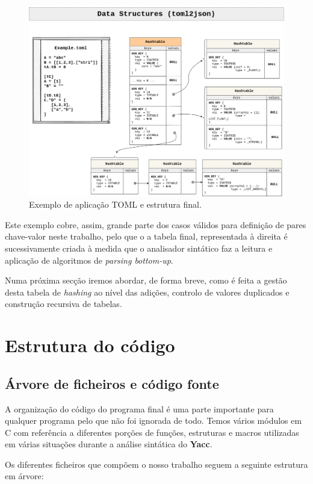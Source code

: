 \documentclass[a4paper,12pt]{report}
\begin{document}
\begin{figure}[h!]
    \centering
    \includegraphics[scale = 0.36]{images/PL_TP2_Structures_1.png}
    \caption{Exemplo de aplicação TOML e estrutura final.}
    \label{fig:my_label}
\end{figure}

Este exemplo cobre, assim, grande parte dos casos válidos para definição de pares chave-valor neste trabalho, pelo que o a tabela final, representada à direita é sucessivamente criada à medida que o analisador sintático faz a leitura e aplicação de algoritmos de \textit{parsing bottom-up}.
\par
Numa próxima secção iremos abordar, de forma breve, como é feita a gestão desta tabela de \textit{hashing} ao nível das adições, controlo de valores duplicados e construção recursiva de tabelas.

\chapter{Estrutura do código}

\section{Árvore de ficheiros e código fonte}

A organização do código do programa final é uma parte importante para qualquer programa pelo que não foi ignorada de todo. Temos vários módulos em C com referência a diferentes porções de funções, estruturas e macros utilizadas em várias situações durante a análise sintática do \textbf{Yacc}.
\par
Os diferentes ficheiros que compõem o nosso trabalho seguem a seguinte estrutura em árvore:
\par
\end{document}
